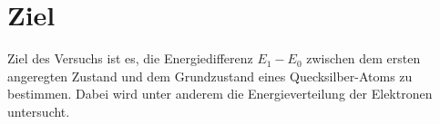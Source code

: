 \section{Ziel}
\label{sec:Ziel}

Ziel des Versuchs ist es, die Energiedifferenz $E_1 - E_0$ zwischen dem ersten angeregten Zustand und dem 
Grundzustand eines Quecksilber-Atoms zu bestimmen. 
Dabei wird unter anderem die Energieverteilung der Elektronen untersucht.

